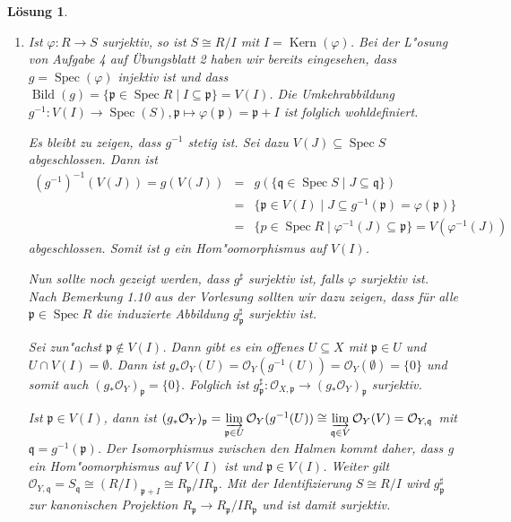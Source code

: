 \documentclass[paper = A4, fontsize=12pt, numbers=noendperiod, chapterprefix=true]{scrbook}
\theoremstyle{break}
\newtheorem{Loes}{L\"osung}
\theoremstyle{nonumberbreak}
\theoremstyle{nonumberplain}
\DeclareMathOperator{\Spec}{Spec}
\DeclareMathOperator{\Kern}{Kern}
\DeclareMathOperator{\Bild}{Bild}
\newcommand{\p}{\mathfrak{p}} %
\newcommand{\q}{\mathfrak{q}} %
\begin{document}
\begin{Loes}
\begin{enumerate}%
  \item[c)] Ist $\varphi\colon R \to S$ surjektiv, so ist $S \cong R/I$ mit $I = \Kern(\varphi)$. Bei der L"osung von Aufgabe 4 auf Übungsblatt 2 haben wir bereits eingesehen, dass $g = \Spec(\varphi)$ injektiv ist und dass $\Bild(g) = \{ \p \in \Spec R \mid I \subseteq \p \} = V(I)$. Die Umkehrabbildung $g^{-1} \colon V(I) \to \Spec(S), \p \mapsto \varphi(\p) = \p + I$ ist folglich wohldefiniert.
  
  Es bleibt zu zeigen, dass $g^{-1}$ stetig ist. Sei dazu $V(J) \subseteq \Spec S$ abgeschlossen. Dann ist 
  $$ \begin{array}{rcl}
        (g^{-1})^{-1}(V(J))
  = g(V(J))
  &=& g(\{\q \in \Spec S \mid J \subseteq \q \})\\
  &=& \{ \p \in V(I) \mid J \subseteq g^{-1}(\p) = \varphi(\p)\}\\
  &=& \{p \in \Spec R \mid \varphi^{-1}(J) \subseteq \p \} = V(\varphi^{-1}(J))
     \end{array}
  $$
  abgeschlossen.
  Somit ist $g$ ein Hom"oomorphismus auf $V(I)$.
  
  Nun sollte noch gezeigt werden, dass $g^\sharp$ surjektiv ist, falls $\varphi$ surjektiv ist. Nach Bemerkung 1.10 aus der Vorlesung sollten wir dazu zeigen, dass für alle $\p \in \Spec R$ die induzierte Abbildung $g^\sharp_{\p}$ surjektiv ist.
  
  Sei zun"achst $\p \notin V(I)$. Dann gibt es ein offenes $U \subseteq X$ mit $\p \in U$ und $U \cap V(I)= \emptyset$. Dann ist $g_\ast \mathcal{O}_Y(U) = \mathcal{O}_Y(g^{-1}(U)) = \mathcal{O}_Y(\emptyset) = \{0\}$ und somit auch $(g_\ast \mathcal{O}_Y)_{\p} = \{0\}$. Folglich ist $g_{\p}^\sharp\colon \mathcal{O}_{X,\p} \to (g_\ast\mathcal{O}_Y)_{\p}$ surjektiv. 
  
  Ist $\p \in V(I)$, dann ist $(g_\ast \mathcal{O}_Y)_{\p} = \varinjlim\limits_{\p \in U} \mathcal{O}_Y(g^{-1}(U)) \cong \varinjlim\limits_{\q \in V} \mathcal{O}_Y(V) = \mathcal{O}_{Y,\q}$ mit $\q = g^{-1}(\p)$. Der Isomorphismus zwischen den Halmen kommt daher, dass g ein Hom"oomorphismus auf $V(I)$ ist und $\p \in V(I)$.
  Weiter gilt $\mathcal{O}_{Y,\q} = S_{\q} \cong (R/I)_{\p+I} \cong R_{\p}/I  R_{\p}$. Mit der Identifizierung $S \cong R/I$ wird $g^\sharp_{\p}$ zur kanonischen Projektion $R_{\p} \to R_{\p}/I R_{\p}$ und ist damit surjektiv.
\end{enumerate}
\end{Loes}
\end{document}
